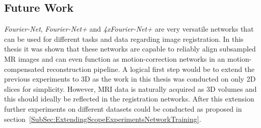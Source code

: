 \subsection{Future Work} \label{SubSec:FutureWork}
\emph{Fourier-Net}, \emph{Fourier-Net+} and \emph{4xFourier-Net+} are very versatile networks that can be used for different tasks and data regarding image registration. In this thesis it was shown that these networks are capable to reliably align subsampled MR images and can even function as motion-correction networks in an motion-compensated reconstruction pipeline. A logical first step would be to extend the previous experiments to 3D as the work in this thesis was conducted on only 2D slices for simplicity. However, MRI data is naturally acquired as 3D volumes and this should ideally be reflected in the registration networks. After this extension further experiments on different datasets could be conducted as proposed in section~\ref{SubSec:ExtendingScopeExperimentsNetworkTraining}.